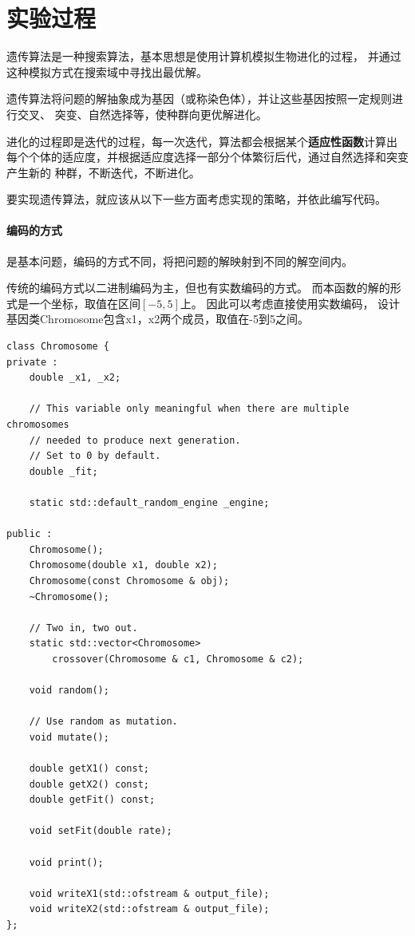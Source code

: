 \documentclass[UTF8]{ctexart}
\begin{document}
\section{实验过程}

遗传算法是一种搜索算法，基本思想是使用计算机模拟生物进化的过程，
并通过这种模拟方式在搜索域中寻找出最优解。

遗传算法将问题的解抽象成为基因（或称染色体），并让这些基因按照一定规则进行交叉、
突变、自然选择等，使种群向更优解进化。

进化的过程即是迭代的过程，每一次迭代，算法都会根据某个\textbf{适应性函数}计算出
每个个体的适应度，并根据适应度选择一部分个体繁衍后代，通过自然选择和突变产生新的
种群，不断迭代，不断进化。

要实现遗传算法，就应该从以下一些方面考虑实现的策略，并依此编写代码。

\paragraph{编码的方式}
是基本问题，编码的方式不同，将把问题的解映射到不同的解空间内。

传统的编码方式以二进制编码为主，但也有实数编码的方式。
而本函数的解的形式是一个坐标，取值在区间$[-5, 5]$上。
因此可以考虑直接使用实数编码，
设计基因类Chromosome包含x1，x2两个成员，取值在-5到5之间。

\begin{lstlisting}
class Chromosome {
private :
    double _x1, _x2;

    // This variable only meaningful when there are multiple chromosomes
    // needed to produce next generation.
    // Set to 0 by default.
    double _fit;

    static std::default_random_engine _engine;

public :
    Chromosome();
    Chromosome(double x1, double x2);
    Chromosome(const Chromosome & obj);
    ~Chromosome();

    // Two in, two out.
    static std::vector<Chromosome>
        crossover(Chromosome & c1, Chromosome & c2);

    void random();

    // Use random as mutation.
    void mutate();

    double getX1() const;
    double getX2() const;
    double getFit() const;

    void setFit(double rate);

    void print();

    void writeX1(std::ofstream & output_file);
    void writeX2(std::ofstream & output_file);
};
\end{lstlisting}
\end{document}
